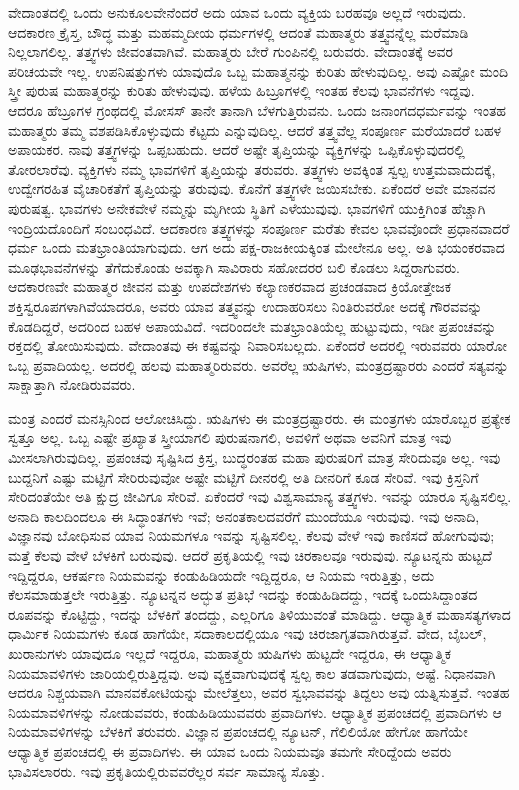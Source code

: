 ವೇದಾಂತದಲ್ಲಿ ಒಂದು ಅನುಕೂಲವೇನೆಂದರೆ ಅದು ಯಾವ ಒಂದು ವ್ಯಕ್ತಿಯ ಬರಹವೂ ಅಲ್ಲದೆ ಇರುವುದು. ಆದಕಾರಣ ಕ್ರೈಸ್ತ, ಬೌದ್ಧ ಮತ್ತು ಮಹಮ್ಮದೀಯ ಧರ್ಮಗಳಲ್ಲಿ ಆದಂತೆ ಮಹಾತ್ಮರು ತತ್ತ್ವವನ್ನೆಲ್ಲ ಮರೆಮಾಡಿ ನಿಲ್ಲಲಾಗಲಿಲ್ಲ. ತತ್ತ್ವಗಳು ಜೀವಂತವಾಗಿವೆ. ಮಹಾತ್ಮರು ಬೇರೆ ಗುಂಪಿನಲ್ಲಿ ಬರುವರು. ವೇದಾಂತಕ್ಕೆ ಅವರ ಪರಿಚಯವೇ ಇಲ್ಲ. ಉಪನಿಷತ್ತುಗಳು ಯಾವುದೊ ಒಬ್ಬ ಮಹಾತ್ಮನನ್ನು ಕುರಿತು ಹೇಳುವುದಿಲ್ಲ. ಅವು ಎಷ್ಟೋ ಮಂದಿ ಸ್ತ್ರೀ ಪುರುಷ ಮಹಾತ್ಮರನ್ನು ಕುರಿತು ಹೇಳುವುವು. ಹಳೆಯ ಹಿಬ್ರೂಗಳಲ್ಲಿ ಇಂತಹ ಕೆಲವು ಭಾವನೆಗಳು ಇದ್ದವು. ಆದರೂ ಹೆಬ್ರೂಗಳ ಗ್ರಂಥದಲ್ಲಿ ಮೋಸಸ್ ತಾನೇ ತಾನಾಗಿ ಬೆಳಗುತ್ತಿರುವನು. ಒಂದು ಜನಾಂಗದ\break ಧರ್ಮವನ್ನು ಇಂತಹ ಮಹಾತ್ಮರು ತಮ್ಮ ವಶಪಡಿಸಿಕೊಳ್ಳುವುದು ಕೆಟ್ಟದು ಎನ್ನುವುದಿಲ್ಲ. ಆದರೆ ತತ್ತ್ವವೆಲ್ಲ ಸಂಪೂರ್ಣ ಮರೆಯಾದರೆ ಬಹಳ ಅಪಾಯಕರ. ನಾವು ತತ್ತ್ವಗಳನ್ನು ಒಪ್ಪಬಹುದು. ಆದರೆ ಅಷ್ಟೇ ತೃಪ್ತಿಯನ್ನು ವ್ಯಕ್ತಿಗಳನ್ನು ಒಪ್ಪಿಕೊಳ್ಳುವುದರಲ್ಲಿ ತೋರಲಾರೆವು. ವ್ಯಕ್ತಿಗಳು ನಮ್ಮ ಭಾವಗಳಿಗೆ ತೃಪ್ತಿಯನ್ನು ತರುವರು. ತತ್ತ್ವಗಳು ಅವಕ್ಕಿಂತ ಸ್ವಲ್ಪ ಉತ್ತಮವಾದುದಕ್ಕೆ, ಉದ್ವೇಗರಹಿತ ವೈಚಾರಿಕತೆಗೆ ತೃಪ್ತಿಯನ್ನು ತರುವುವು. ಕೊನೆಗೆ ತತ್ತ್ವಗಳೇ ಜಯಿಸಬೇಕು. ಏಕೆಂದರೆ ಅವೇ ಮಾನವನ ಪುರುಷತ್ವ. ಭಾವಗಳು ಅನೇಕವೇಳೆ ನಮ್ಮನ್ನು ಮೃಗೀಯ ಸ್ಥಿತಿಗೆ ಎಳೆಯುವುವು. ಭಾವಗಳಿಗೆ ಯುಕ್ತಿಗಿಂತ ಹೆಚ್ಚಾಗಿ ಇಂದ್ರಿಯದೊಂದಿಗೆ ಸಂಬಂಧವಿದೆ. ಆದಕಾರಣ ತತ್ತ್ವಗಳನ್ನು ಸಂಪೂರ್ಣ ಮರೆತು ಕೇವಲ ಭಾವವೊಂದೇ ಪ್ರಧಾನವಾದರೆ ಧರ್ಮ ಒಂದು ಮತಭ್ರಾಂತಿಯಾಗುವುದು. ಆಗ ಅದು ಪಕ್ಷ-ರಾಜಕೀಯಕ್ಕಿಂತ ಮೇಲೇನೂ ಅಲ್ಲ. ಅತಿ ಭಯಂಕರವಾದ ಮೂಢಭಾವನೆಗಳನ್ನು ತೆಗೆದುಕೊಂಡು ಅವಕ್ಕಾಗಿ ಸಾವಿರಾರು ಸಹೋದರರ ಬಲಿ ಕೊಡಲು ಸಿದ್ದರಾಗುವರು. ಆದಕಾರಣವೇ ಮಹಾತ್ಮರ ಜೀವನ ಮತ್ತು ಉಪದೇಶಗಳು ಕಲ್ಯಾಣಕರವಾದ ಪ್ರಚಂಡವಾದ ಕ್ರಿಯೋತ್ತೇಜಕ ಶಕ್ತಿಸ್ವರೂಪಗಳಾಗಿವೆಯಾದರೂ, ಅವರು ಯಾವ ತತ್ತ್ವವನ್ನು ಉದಾಹರಿಸಲು ನಿಂತಿರುವರೋ ಅದಕ್ಕೆ ಗೌರವವನ್ನು ಕೊಡದಿದ್ದರೆ, ಅದರಿಂದ ಬಹಳ ಅಪಾಯವಿದೆ. ಇದರಿಂದಲೇ ಮತಭ್ರಾಂತಿಯೆಲ್ಲ ಹುಟ್ಟುವುದು, ಇಡೀ ಪ್ರಪಂಚವನ್ನು ರಕ್ತದಲ್ಲಿ ತೋಯಿಸುವುದು. ವೇದಾಂತವು ಈ ಕಷ್ಟವನ್ನು ನಿವಾರಿಸಬಲ್ಲದು. ಏಕೆಂದರೆ ಅದರಲ್ಲಿ ಇರುವವರು ಯಾರೋ ಒಬ್ಬ ಪ್ರವಾದಿಯಲ್ಲ. ಅದರಲ್ಲಿ ಹಲವು ಮಹಾತ್ಮರಿರುವರು. ಅವರೆಲ್ಲ ಋಷಿಗಳು, ಮಂತ್ರದ್ರಷ್ಟಾರರು ಎಂದರೆ ಸತ್ಯವನ್ನು ಸಾಕ್ಷಾತ್ತಾಗಿ ನೋಡಿರುವವರು.

ಮಂತ್ರ ಎಂದರೆ ಮನಸ್ಸಿನಿಂದ ಆಲೋಚಿಸಿದ್ದು. ಋಷಿಗಳು ಈ ಮಂತ್ರದ್ರಷ್ಟಾರರು. ಈ ಮಂತ್ರಗಳು ಯಾರೊಬ್ಬರ ಪ್ರತ್ಯೇಕ ಸ್ವತ್ತೂ ಅಲ್ಲ. ಒಬ್ಬ ಎಷ್ಟೇ ಪ್ರಖ್ಯಾತ ಸ್ತ್ರೀಯಾಗಲಿ ಪುರುಷನಾಗಲಿ, ಅವಳಿಗೆ ಅಥವಾ ಅವನಿಗೆ ಮಾತ್ರ ಇವು ಮೀಸಲಾಗಿರುವುದಿಲ್ಲ. ಪ್ರಪಂಚವು ಸೃಷ್ಟಿಸಿದ ಕ್ರಿಸ್ತ, ಬುದ್ಧರಂತಹ ಮಹಾ ಪುರುಷರಿಗೆ ಮಾತ್ರ ಸೇರಿದುವೂ ಅಲ್ಲ. ಇವು ಬುದ್ದನಿಗೆ ಎಷ್ಟು ಮಟ್ಟಿಗೆ ಸೇರಿರುವುವೋ ಅಷ್ಟೇ ಮಟ್ಟಿಗೆ ದೀನರಲ್ಲಿ ಅತಿ ದೀನರಿಗೆ ಕೂಡ ಸೇರಿವೆ. ಇವು ಕ್ರಿಸ್ತನಿಗೆ ಸೇರಿದಂತೆಯೇ ಅತಿ ಕ್ಷುದ್ರ ಜೀವಿಗೂ ಸೇರಿವೆ. ಏಕೆಂದರೆ ಇವು ವಿಶ್ವಸಾಮಾನ್ಯ ತತ್ತ್ವಗಳು. ಇವನ್ನು ಯಾರೂ ಸೃಷ್ಟಿಸಲಿಲ್ಲ. ಅನಾದಿ ಕಾಲದಿಂದಲೂ ಈ ಸಿದ್ಧಾಂತಗಳು ಇವೆ; ಅನಂತಕಾಲದವರೆಗೆ ಮುಂದೆಯೂ ಇರುವುವು. ಇವು ಅನಾದಿ, ವಿಜ್ಞಾನವು ಬೋಧಿಸುವ ಯಾವ ನಿಯಮಗಳೂ ಇವನ್ನು ಸೃಷ್ಟಿಸಲಿಲ್ಲ. ಕೆಲವು ವೇಳೆ ಇವು ಕಾಣಿಸದೆ ಹೋಗುವುವು; ಮತ್ತೆ ಕೆಲವು ವೇಳೆ ಬೆಳಕಿಗೆ ಬರುವುವು. ಆದರೆ ಪ್ರಕೃತಿಯಲ್ಲಿ ಇವು ಚಿರಕಾಲವೂ ಇರುವುವು. ನ್ಯೂಟನ್ನನು ಹುಟ್ಟದೆ ಇದ್ದಿದ್ದರೂ, ಆಕರ್ಷಣ ನಿಯಮವನ್ನು ಕಂಡುಹಿಡಿಯದೇ ಇದ್ದಿದ್ದರೂ, ಆ ನಿಯಮ ಇರುತ್ತಿತ್ತು, ಅದು ಕೆಲಸಮಾಡುತ್ತಲೇ ಇರುತ್ತಿತ್ತು. ನ್ಯೂಟನ್ನನ ಅದ್ಭುತ ಪ್ರತಿಭೆ ಇದನ್ನು ಕಂಡುಹಿಡಿದದ್ದು, ಇದಕ್ಕೆ ಒಂದುಸಿದ್ದಾಂತದ ರೂಪವನ್ನು ಕೊಟ್ಟಿದ್ದು, ಇದನ್ನು ಬೆಳಕಿಗೆ ತಂದದ್ದು, ಎಲ್ಲರಿಗೂ ತಿಳಿಯುವಂತೆ ಮಾಡಿದ್ದು. ಆಧ್ಯಾತ್ಮಿಕ ಮಹಾಸತ್ಯಗಳಾದ ಧಾರ್ಮಿಕ ನಿಯಮಗಳು ಕೂಡ ಹಾಗೆಯೇ, ಸದಾಕಾಲದಲ್ಲಿಯೂ ಇವು ಚಿರಜಾಗೃತವಾಗಿರುತ್ತವೆ. ವೇದ, ಬೈಬಲ್, ಖುರಾನುಗಳು ಯಾವುದೂ ಇಲ್ಲದೆ ಇದ್ದರೂ, ಮಹಾತ್ಮರು ಋಷಿಗಳು ಹುಟ್ಟದೇ ಇದ್ದರೂ, ಈ ಆಧ್ಯಾತ್ಮಿಕ ನಿಯಮಾವಳಿಗಳು ಜಾರಿಯಲ್ಲಿರುತ್ತಿದ್ದವು. ಅವು ವ್ಯಕ್ತವಾಗುವುದಕ್ಕೆ ಸ್ವಲ್ಪ ಕಾಲ ತಡವಾಗುವುದು, ಅಷ್ಟೆ. ನಿಧಾನವಾಗಿ ಆದರೂ ನಿಶ್ಚಯವಾಗಿ ಮಾನವಕೋಟಿಯನ್ನು ಮೇಲೆತ್ತಲು, ಅವರ ಸ್ವಭಾವವನ್ನು ತಿದ್ದಲು ಅವು ಯತ್ನಿಸುತ್ತವೆ. ಇಂತಹ ನಿಯಮಾವಳಿಗಳನ್ನು ನೋಡುವವರು, ಕಂಡುಹಿಡಿಯುವವರು ಪ್ರವಾದಿಗಳು. ಆಧ್ಯಾತ್ಮಿಕ ಪ್ರಪಂಚದಲ್ಲಿ ಪ್ರವಾದಿಗಳು ಆ ನಿಯಮಾವಳಿಗಳನ್ನು ಬೆಳಕಿಗೆ ತರುವರು. ವಿಜ್ಞಾನ ಪ್ರಪಂಚದಲ್ಲಿ ನ್ಯೂಟನ್, ಗೆಲಿಲಿಯೋ ಹೇಗೋ ಹಾಗೆಯೇ ಆಧ್ಯಾತ್ಮಿಕ ಪ್ರಪಂಚದಲ್ಲಿ ಈ ಪ್ರವಾದಿಗಳು. ಈ ಯಾವ ಒಂದು ನಿಯಮವೂ ತಮಗೇ ಸೇರಿದ್ದೆಂದು ಅವರು ಭಾವಿಸಲಾರರು. ಇವು ಪ್ರಕೃತಿಯಲ್ಲಿರುವವರೆಲ್ಲರ ಸರ್ವ ಸಾಮಾನ್ಯ ಸೊತ್ತು.

